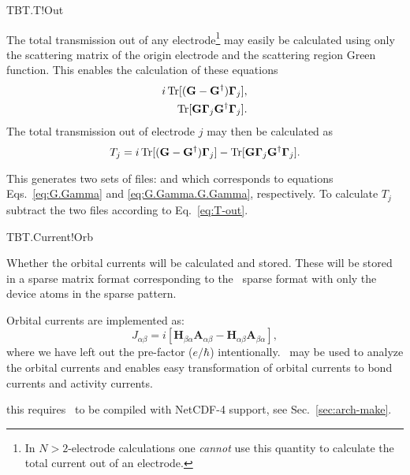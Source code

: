\begin{fdflogicalF}{TBT.T!Out}
  
  The total transmission out of any electrode\footnote{In
      $N>2$-electrode calculations one \emph{cannot} use this quantity
      to calculate the total current out of an electrode.} may easily
  be calculated using only the scattering matrix of the origin
  electrode and the scattering region Green function.
  This enables the calculation of these equations
  \begin{align}
    i\operatorname{Tr}[(\mathbf G - \mathbf G^\dagger)\boldsymbol \Gamma_j],
    \label{eq:G.Gamma}
    \\
    \operatorname{Tr}[\mathbf G \boldsymbol \Gamma_j \mathbf G^\dagger\boldsymbol
    \Gamma_j].
    \label{eq:G.Gamma.G.Gamma}
  \end{align}
  The total transmission out of electrode $j$ may then be calculated
  as
  \begin{equation}
    \label{eq:T-out}
    T_j = i\operatorname{Tr}[(\mathbf G - \mathbf G^\dagger)\boldsymbol \Gamma_j] 
    -
    \operatorname{Tr}[\mathbf G \boldsymbol \Gamma_j \mathbf G^\dagger\boldsymbol \Gamma_j].
  \end{equation}

  This generates two sets of files:  and
   which corresponds to equations
  Eqs.~\eqref{eq:G.Gamma} and \eqref{eq:G.Gamma.G.Gamma},
  respectively. To calculate $T_j$ subtract the two files
  according to Eq.~\eqref{eq:T-out}.
  
\end{fdflogicalF}

\begin{fdflogicalF}{TBT.Current!Orb}

  Whether the orbital currents will be calculated and stored.  These
  will be stored in a sparse matrix format corresponding to the
  \siesta\ sparse format with only the device atoms in the sparse
  pattern.
  
  Orbital currents are implemented as:
  \begin{equation}
    J_{\alpha \beta} = i [
    \mathbf H_{\beta\alpha} \mathbf A_{\alpha\beta}
    - 
    \mathbf H_{\alpha\beta} \mathbf A_{\beta\alpha}],
  \end{equation}
  where we have left out the pre-factor ($e/\hbar$)
  intentionally. \sisl\ may be used to analyze the orbital currents
  and enables easy transformation of orbital currents to
  bond currents and activity currents.

  \note this requires \tbtrans\ to be compiled with NetCDF-4 support,
  see Sec.~\ref{sec:arch-make}.
  
\end{fdflogicalF}

